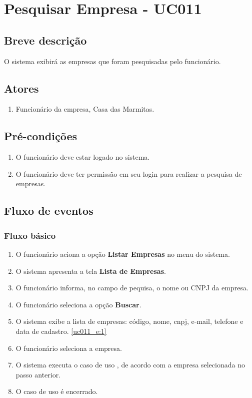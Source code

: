\chapter{Pesquisar Empresa - UC011} \label{uc011}

\section{Breve descrição}

O sistema exibirá as empresas que foram pesquisadas pelo funcionário.

\section{Atores}

\begin{enumerate}
	\item Funcionário da empresa, Casa das Marmitas.
\end{enumerate}

\section{Pré-condições}

\begin{enumerate}
	\item O funcionário deve estar logado no sistema.
	\item O funcionário deve ter permissão em seu login para realizar a pesquisa de empresas.
\end{enumerate}

\section{Fluxo de eventos}

\subsection{Fluxo básico}

\begin{enumerate}[label=P\arabic*]
	\item O funcionário aciona a opção \textbf{Listar Empresas} no menu do sistema.
	\item O sistema apresenta a tela \textbf{Lista de Empresas}. \label{uc011_p:2}	
	\item O funcionário informa, no campo de pequisa, o nome ou CNPJ da empresa.
	\item O funcionário seleciona a opção \textbf{Buscar}.
	\item O sistema exibe a lista de empresas: código, nome, cnpj, e-mail, telefone e data de cadastro. \label{uc011_p:5}\ref{uc011_e:1}
	\item O funcionário seleciona a empresa.
	\item O sistema executa o caso de uso , de acordo com a empresa selecionada no passo anterior.
	\item O caso de uso é encerrado.
\end{enumerate}

